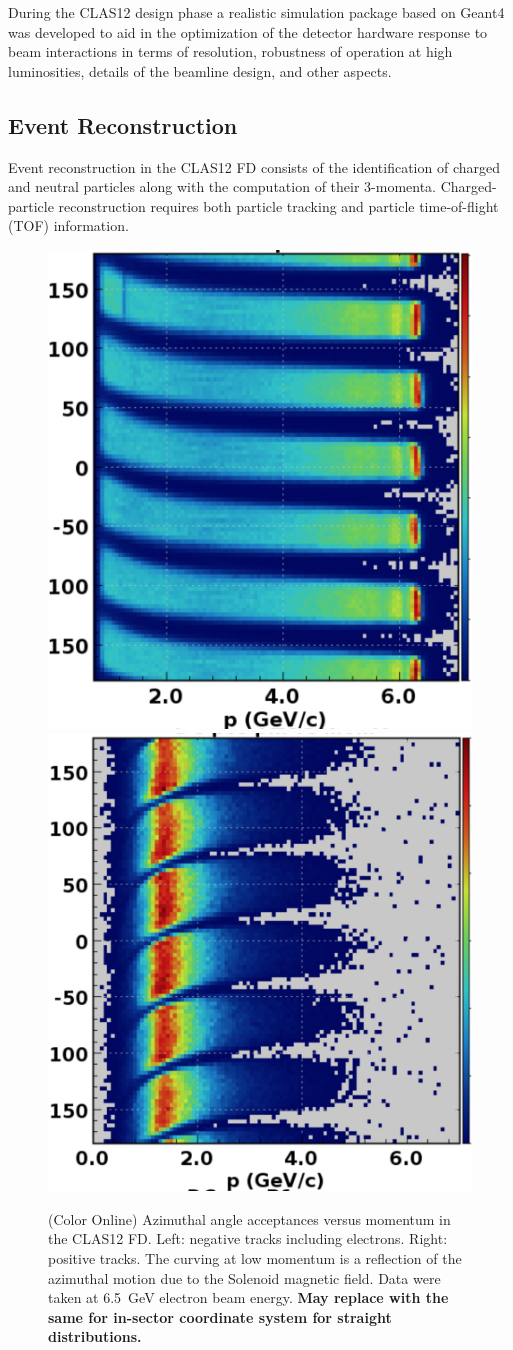 \documentclass[final,3p,twocolumn]{elsarticle}
\begin{document}
During the CLAS12 design phase a realistic simulation package based on Geant4 was developed to aid in the optimization 
of the detector hardware response to beam interactions in terms of resolution, robustness of operation at high
luminosities, details of the beamline design, and other aspects. 

\subsection{Event Reconstruction} 

Event reconstruction in the CLAS12 FD consists of the identification of charged and neutral particles along with the 
computation of their 3-momenta. Charged-particle reconstruction requires both particle tracking and particle 
time-of-flight (TOF) information. 

\begin{figure}[htbp!]
\centerline {
\includegraphics[width=0.5\columnwidth]{neg-tracks.png}
\includegraphics[width=0.52\columnwidth]{pos-tracks.png}}
\caption{(Color Online) Azimuthal angle acceptances versus momentum in the CLAS12 FD. Left: negative tracks including electrons.
Right: positive tracks. The curving at low momentum is a reflection of the azimuthal motion due to the Solenoid magnetic
field. Data were taken at 6.5~GeV electron beam energy. {\bf May replace with the same for in-sector coordinate
system for straight distributions.}} 
\label{neg-pos}
\end{figure}
\end{document}
